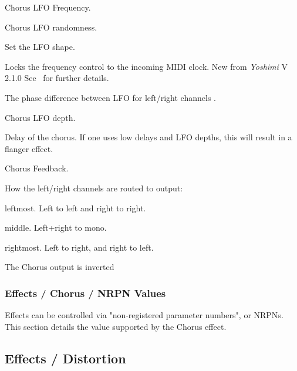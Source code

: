    \setcounter{ItemCounter}{0}      %

   Chorus LFO Frequency.

   Chorus LFO randomness.

   Set the LFO shape.

   Locks the frequency control to the incoming MIDI clock. New from
   \textsl{Yoshimi} V 2.1.0 See
   \ for further details.

   The phase difference between LFO for left/right channels .

   Chorus LFO depth.

   Delay of the chorus.
   If one uses low delays and LFO depths, this will result in a flanger
   effect.

   Chorus Feedback.

   How the left/right channels are routed to output:

      \begin{enumber}
         \item leftmost. Left to left and right to right.
         \item middle. Left+right to mono.
         \item rightmost. Left to right, and right to left.
      \end{enumber}

   The Chorus output is inverted

\subsubsection{Effects / Chorus / NRPN Values}
\label{subsubsec:effects_edit_chorus_nrpn}

Effects can be controlled via "non-registered parameter numbers", or NRPNs.
This section details the value supported by the Chorus effect.

\subsection{Effects / Distortion}
\label{subsec:effects_edit_distortion}

